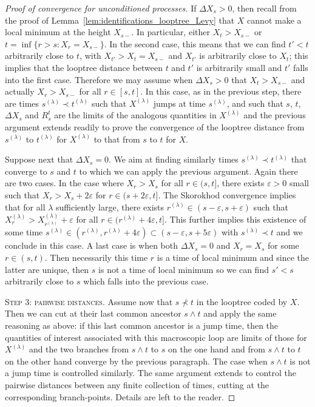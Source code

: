 \documentclass[british, a4paper,11pt]{article}
\numberwithin{equation}{section}
\theoremstyle{definition}
\begin{document}
\begin{proof}[Proof of convergence for unconditioned processes]
If $\Delta X_s>0$, then recall from the proof of Lemma~\ref{lem:identifications_looptree_Levy} that $X$ cannot make a local minimum at the height $X_{s-}$. In particular, either $X_t>X_{s-}$ or $t = \inf\{r>s \colon X_r = X_{s-}\}$. In the second case, this means that we can find $t'<t$ arbitrarily close to $t$, with $X_{t'}>X_{t}=X_{s-}$ and $X_{t'}$ is arbitrarily close to $X_t$; this implies that the looptree distance between $t$ and $t'$ is arbitrarily small and $t'$ falls into the first case. Therefore we may assume when $\Delta X_s>0$ that $X_t>X_{s-}$ and actually $X_r > X_{s-}$ for all $r \in [s,t]$. 
In this case, as 
in the previous step, there are times $s^{(\lambda)} \prec t^{(\lambda)}$ 
such that $X^{(\lambda)}$ jumps at time $s^{(\lambda)}$, and such that $s$, $t$, $\Delta X_s$ and $R^t_s$ are the limits of the analogous quantities in $X^{(\lambda)}$ and the previous argument extends readily to prove the convergence of the looptree distance from $s^{(\lambda)}$ to $t^{(\lambda)}$ for $X^{(\lambda)}$ to that from $s$ to $t$ for $X$.

Suppose next that $\Delta X_s = 0$. We aim at finding similarly times $s^{(\lambda)} \prec t^{(\lambda)}$ that converge to $s$ and $t$ to which we can apply the previous argument.
Again there are two cases.
In the case where $X_r>X_s$ for all $r \in (s,t]$, there exists $\varepsilon>0$ small such that $X_r > X_s+2\varepsilon$ for $r \in (s+2\varepsilon,t]$. The Skorokhod convergence implies that for all $\lambda$ sufficiently large, there exists $r^{(\lambda)} \in (s-\varepsilon, s+\varepsilon)$ such that $X^{(\lambda)}_r > X^{(\lambda)}_{r^{(\lambda)}}+\varepsilon$ for all $r \in (r^{(\lambda)}+4\varepsilon,t]$. This further implies this existence of some time $s^{(\lambda)} \in (r^{(\lambda)}, r^{(\lambda)}+4\varepsilon) \subset (s-\varepsilon, s+5\varepsilon)$ with $s^{(\lambda)} \prec t$ and we conclude in this case.
A last case is when both $\Delta X_s = 0$ and $X_r=X_s$ for some $r \in (s,t)$. Then necessarily this time $r$ is a time of local minimum and since the latter are unique, then $s$ is not a time of local minimum so we can find $s'<s$ arbitrarily close to $s$ which falls into the previous case.

\textsc{Step 3: pairwise distances.}
Assume now that $s \not\prec t$ in the looptree coded by $X$. Then we can cut at their last common ancestor $s \wedge t$ and apply the same reasoning as above: if this last common ancestor is a jump time, then the quantities of interest associated with this macroscopic loop are limits of those for $X^{(\lambda)}$ and the two branches from $s \wedge t$ to $s$ on the one hand and from $s \wedge t$ to $t$ on the other hand converge by the previous paragraph.
The case when $s \wedge t$ is not a jump time is controlled similarly.
The same argument extends to control the pairwise distances between any finite collection of times, cutting at the corresponding branch-points.
Details are left to the reader.



\end{proof}
\end{document}
